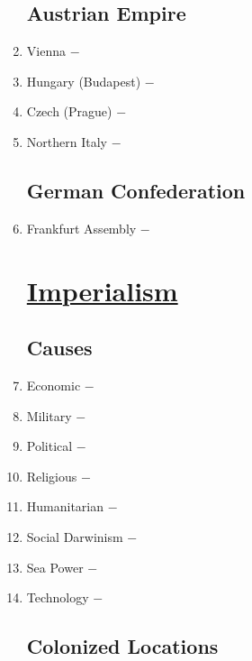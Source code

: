\documentclass[12pt]{article}
\begin{document}
\begin{enumerate}
\begin{enumerate}[label=\arabic{*}.]
\end{enumerate}
\setcounter{enumi}{464}

\subsection{Austrian Empire}

\item Vienna $-$ 

\item Hungary (Budapest) $-$ 

\item Czech (Prague) $-$ 

\item Northern Italy $-$ 

\subsection{German Confederation}


\item Frankfurt Assembly $-$ 

\section{\underline{Imperialism}}

\subsection{Causes}

\item Economic $-$ 

\item Military $-$ 

\item Political $-$ 

\item Religious $-$ 

\item Humanitarian $-$ 

\item Social Darwinism $-$ 

\item Sea Power $-$ 

\item Technology $-$ 

\subsection{Colonized Locations}


\end{enumerate}
\end{document}
